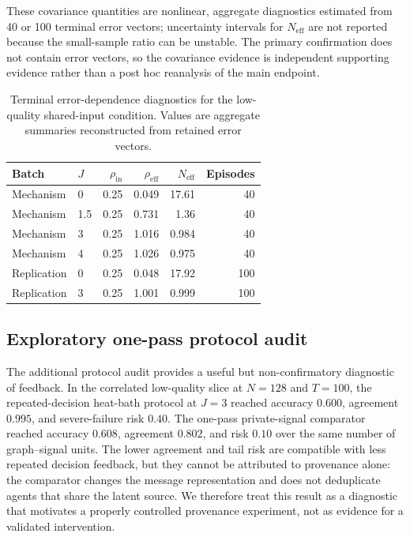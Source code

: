 \documentclass[11pt,a4paper]{article}
\begin{document}
These covariance quantities are nonlinear, aggregate diagnostics estimated from 40 or 100 terminal error vectors; uncertainty intervals for $N_{\mathrm{eff}}$ are not reported because the small-sample ratio can be unstable. The primary confirmation does not contain error vectors, so the covariance evidence is independent supporting evidence rather than a post hoc reanalysis of the main endpoint.

\begin{table}[htbp]
\centering
\caption{Terminal error-dependence diagnostics for the low-quality shared-input condition. Values are aggregate summaries reconstructed from retained error vectors.}
\label{tab:covariance}
\small
\begin{tabular}{@{}llrrrr@{}}
\toprule
Batch & $J$ & $\rho_{\mathrm{in}}$ & $\rho_{\mathrm{eff}}$ & $N_{\mathrm{eff}}$ & Episodes \\
\midrule
Mechanism & 0 & 0.25 & 0.049 & 17.61 & 40 \\
Mechanism & 1.5 & 0.25 & 0.731 & 1.36 & 40 \\
Mechanism & 3 & 0.25 & 1.016 & 0.984 & 40 \\
Mechanism & 4 & 0.25 & 1.026 & 0.975 & 40 \\
Replication & 0 & 0.25 & 0.048 & 17.92 & 100 \\
Replication & 3 & 0.25 & 1.001 & 0.999 & 100 \\
\bottomrule
\end{tabular}
\end{table}

\subsection{Exploratory one-pass protocol audit}

The additional protocol audit provides a useful but non-confirmatory diagnostic of feedback. In the correlated low-quality slice at $N=128$ and $T=100$, the repeated-decision heat-bath protocol at $J=3$ reached accuracy $0.600$, agreement $0.995$, and severe-failure risk $0.40$. The one-pass private-signal comparator reached accuracy $0.608$, agreement $0.802$, and risk $0.10$ over the same number of graph--signal units. The lower agreement and tail risk are compatible with less repeated decision feedback, but they cannot be attributed to provenance alone: the comparator changes the message representation and does not deduplicate agents that share the latent source. We therefore treat this result as a diagnostic that motivates a properly controlled provenance experiment, not as evidence for a validated intervention.
\end{document}
